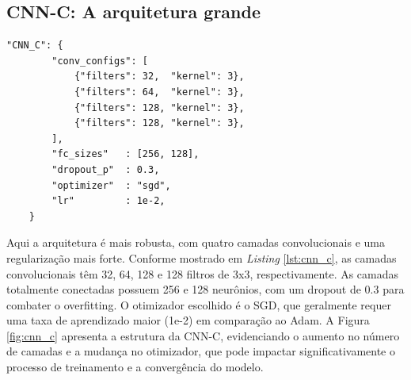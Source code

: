 \documentclass[a4paper,12pt]{article}
\begin{document}
\subsection{CNN-C: A arquitetura grande}

\begin{lstlisting}[style=python, caption={Arquitetura C (CNN grande).}, label={lst:cnn_c}]
"CNN_C": {
        "conv_configs": [
            {"filters": 32,  "kernel": 3},
            {"filters": 64,  "kernel": 3},
            {"filters": 128, "kernel": 3},
            {"filters": 128, "kernel": 3},
        ],
        "fc_sizes"   : [256, 128],
        "dropout_p"  : 0.3,
        "optimizer"  : "sgd",
        "lr"         : 1e-2,   
    }
\end{lstlisting}

Aqui a arquitetura é mais robusta, com quatro camadas convolucionais e uma regularização mais forte. Conforme mostrado em \textit{Listing} \ref{lst:cnn_c}, as camadas convolucionais têm 32, 64, 128 e 128 filtros de 3x3, respectivamente. As camadas totalmente conectadas possuem 256 e 128 neurônios, com um dropout de 0.3 para combater o overfitting. O otimizador escolhido é o SGD, que geralmente requer uma taxa de aprendizado maior (1e-2) em comparação ao Adam.
A Figura \ref{fig:cnn_c} apresenta a estrutura da CNN-C, evidenciando o aumento no número de camadas e a mudança no otimizador, que pode impactar significativamente o processo de treinamento e a convergência do modelo.
\end{document}
